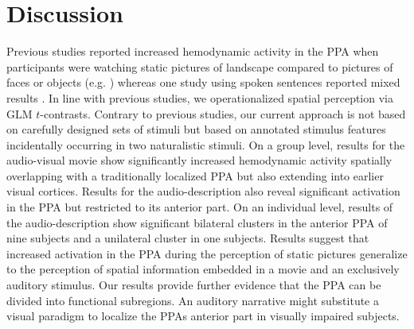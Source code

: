 \documentclass[english]{article}
\begin{document}
\section{Discussion}





Previous studies reported increased hemodynamic activity in the PPA when
participants were watching static pictures of landscape compared to pictures of
faces or objects (e.g. \citep{epstein1998ppa, epstein1999parahippocampal})
whereas one study using spoken sentences reported mixed results
\citep{aziz2008modulation}.
In line with previous studies, we operationalized spatial perception via GLM $t$-contrasts.
Contrary to previous studies, our current approach is not based on carefully
designed sets of stimuli but based on annotated stimulus features incidentally
occurring in two naturalistic stimuli.
On a group level, results for the audio-visual movie show
significantly increased hemodynamic activity spatially overlapping with a
traditionally localized PPA but also extending into earlier visual cortices.
Results for the audio-description also reveal significant activation in the PPA
but restricted to its anterior part.
On an individual level, results of the audio-description show significant
bilateral clusters in the anterior PPA of nine subjects and a unilateral cluster
in one subjects.
Results suggest that increased activation in the PPA during the perception of
static pictures generalize to the perception of spatial information embedded in
a movie and an exclusively auditory stimulus.
Our results provide further evidence that the PPA can be divided into functional
subregions.
An auditory narrative might substitute a visual paradigm to localize the PPAs
anterior part in visually impaired subjects.
\end{document}
